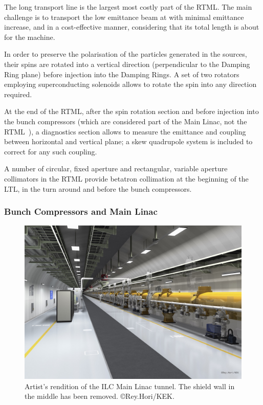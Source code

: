 The long transport line is the largest most costly part of the RTML.
The main challenge is to transport the low emittance beam at  with minimal emittance increase, and in a cost-effective manner, considering that its total length is about  for the  machine.

In order to preserve the polarisation of the particles generated in the sources, their spins are rotated into a vertical direction (perpendicular to the Damping Ring plane) before injection into the Damping Rings. 
A set of two rotators~\cite{Emma:1995kf} employing superconducting solenoids allows to rotate the spin into any direction required.

At the end of the RTML, after the spin rotation section and before injection into the bunch compressors (which are considered part of the Main Linac, not the RTML~\cite{bib:cr-0010}), a diagnostics section allows to measure the emittance and coupling between horizontal and vertical plane; 
a skew quadrupole system is included to correct for any such coupling.

A number of circular, fixed aperture and rectangular, variable aperture collimators in the RTML provide betatron collimation at the beginning of the LTL, in the turn around and before the bunch compressors.


\subsubsection{Bunch Compressors and Main Linac}

\begin{figure}[htbp]
   \includegraphics[width=\hsize]{chapters/figures/ILC2016_tunnel_A1_160826-low4}
\caption{Artist's rendition of the ILC Main Linac tunnel. The shield wall in the middle has been removed.
\copyright Rey.Hori/KEK.}
\label{fig:ilc-tunnel}
\end{figure}


